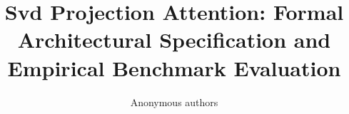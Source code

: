 \title{\textbf{Svd Projection Attention: Formal Architectural Specification and Empirical Benchmark Evaluation}}

\author{Anonymous authors}
